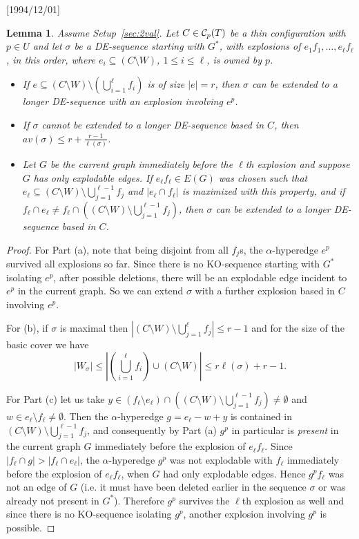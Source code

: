 \NeedsTeXFormat{LaTeX2e}[1994/12/01]\documentclass[letterpaper, 11pt]{article}
\newtheorem{lem}[thm]{Lemma}
\theoremstyle{definition}
\theoremstyle{remark}
\numberwithin{equation}{section}
\begin{document}
\begin{lem}\label{lem:multiexp}
Assume Setup~\ref{sec:2val}. Let $C\in {\cal C}_p(T)$ be a thin configuration with
  $p\in U$ and let $\sigma$ be a 
  DE-sequence starting with $G^*$, with explosions
  of $e_1f_1, \ldots , e_{\ell}f_{\ell}$, in this order, 
  where $e_i\subseteq (C\setminus W)$, $1\leq i \leq \ell$, is owned by $p$. 
\begin{itemize}
    \item[(a)] If $e\subseteq (C\setminus W) \setminus \left(\bigcup_{i=1}^{\ell}
  f_i\right)$ is of size $|e|=r$, then $\sigma$ can be extended to a
longer DE-sequence with an explosion involving $e^p$. 
\item[(b)] If $\sigma$ cannot be extended to a longer DE-sequence based in $C$, then 
$av(\sigma)\leq r+\frac{r-1}{\ell(\sigma)}$.
\item[(c)] Let $G$ be the current graph immediately before the $\ell$th
  explosion and suppose $G$ has only explodable edges.
If $e_{\ell}f_{\ell}\in E(G)$ was chosen such that $e_{\ell} \subseteq
(C\setminus W) \setminus \bigcup_{j=1}^{\ell-1}
  f_j$ and $|e_{\ell}\cap
f_{\ell}|$ is maximized with this property, and if $f_{\ell} \cap e_ {\ell} \neq f_{\ell}
  \cap \left((C\setminus W) \setminus \bigcup_{j=1}^{\ell-1}
  f_j\right)$, then $\sigma$ can be extended to a
longer DE-sequence based in $C$.
\end{itemize}
\end{lem}
\begin{proof}
For Part (a), note that being disjoint
from all $f_j$s, the $\alpha$-hyperedge $e^p$ survived all explosions
so far. Since there is no  
KO-sequence starting with $G^*$ isolating $e^p$, after possible
deletions, there will be an explodable edge incident to $e^p$ in the
current graph. So we can extend $\sigma$ with a further explosion
based in $C$ involving $e^p$.

For (b), if $\sigma$ is maximal then
$\left|(C\setminus W) \setminus \bigcup_{j=1}^{\ell}
    f_j \right|\leq r-1$ and for the size of the basic cover we have 
$$|W_{\sigma}| \leq \left|\left(\bigcup_{i=1}^{\ell} f_i\right) \cup
  (C\setminus W)\right| \leq r\ell(\sigma) + r-1.$$  

For Part (c) let us take $y \in (f_\ell \setminus e_{\ell}) \cap \left( (C\setminus W) \setminus \bigcup_{j=1}^{\ell-1} f_j \right) \neq \emptyset$
and $w\in e_{\ell}\setminus f_{\ell} \neq \emptyset$. 
Then the $\alpha$-hyperedge $g = e_{\ell} -w +y$ is contained in $ (C\setminus W) \setminus \bigcup_{j=1}^{\ell-1} f_j $, and
consequently by Part (a) $g^p$ in particular is {\em present} in
the current graph $G$ immediately before the explosion of
$e_{\ell}f_{\ell}$. Since $|f_{\ell} \cap g| > |f_{\ell} \cap
e_{\ell}|$, the $\alpha$-hyperedge $g^p$ was not 
explodable with $f_{\ell}$ immediately before the explosion of
$e_{\ell}f_{\ell}$, when $G$ had only explodable edges.
Hence $g^pf_{\ell}$ was not an edge of $G$ (i.e. it must have been deleted earlier in the sequence $\sigma$ or was already not present in $G^*$).
Therefore $g^p$ survives the $\ell$th explosion as well and since
there is no KO-sequence isolating $g^p$, another explosion involving
$g^p$ is possible.
\end{proof}
\end{document}
